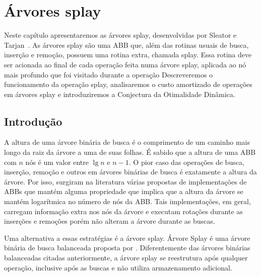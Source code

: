 
\chapter{Árvores splay}
\label{cap:arvores-splay}

\newtheorem{caso}{Caso}

Neste capítulo apresentaremos as árvores splay, desenvolvidas por Sleator e Tarjan~\cite{selfadjustingbst}. As árvores splay são uma ABB que, além das rotinas usuais de busca, inserção e remoção, possuem uma rotina extra, chamada splay. Essa rotina deve ser acionada ao final de cada operação feita numa árvore splay, aplicada ao nó mais profundo que foi visitado durante a operação Descreveremos o funcionamento da operação splay, analisaremos o custo amortizado de operações em árvores splay e introduziremos a Conjectura da Otimalidade Dinâmica.


\section{Introdução}
A altura de uma árvore binária de busca é o comprimento de um caminho mais longo da raiz da árvore a uma de suas folhas. É sabido que a altura de uma ABB com $n$ nós é um valor entre $\lg n$ e $n-1$. O pior caso das operações de busca, inserção, remoção e outros em árvores binárias de busca é exatamente a altura da árvore. Por isso, surgiram na literatura várias propostas de implementações de ABBs que mantém alguma propriedade que implica que a altura da árvore se mantém logarítmica no número de nós da ABB. Tais implementações, em geral, carregam informação extra nos nós da árvore e executam rotações durante as inserções e remoções porém não alteram a árvore durante as buscas.

Uma alternativa a essas estratégias é a árvore splay. Árvore Splay é uma árvore binária de busca balanceada proposta por \cite{selfadjustingbst}. Diferentemente das árvores binárias balanceadas citadas anteriormente, a árvore splay se reestrutura após qualquer operação, inclusive após as buscas e não utiliza armazenamento adicional.


